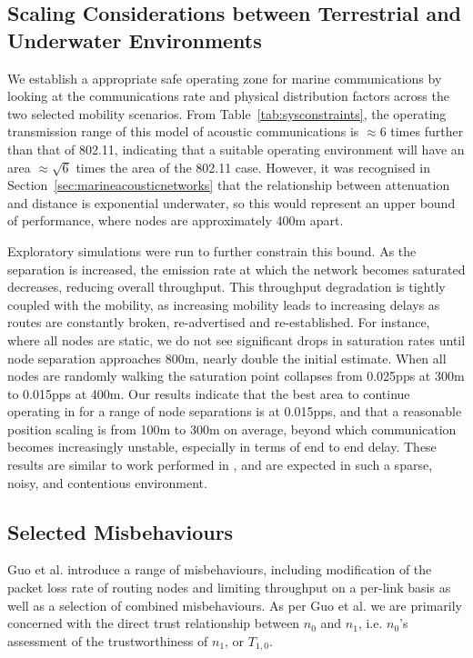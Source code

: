 \documentclass[conference]{IEEEtran}
\begin{document}
\subsection{Scaling Considerations between Terrestrial and Underwater Environments}

We establish a appropriate safe operating zone for marine communications by looking at the communications rate and physical distribution factors across the two selected mobility scenarios.
From Table~\ref{tab:sysconstraints}, the operating transmission range of this model of acoustic communications is $\approx 6$ times further than that of 802.11, indicating that a suitable operating environment will have an area $\approx \sqrt{6}$ times the area of the 802.11 case.
However, it was recognised in Section~\ref{sec:marineacousticnetworks} that the relationship between attenuation and distance is exponential underwater, so this would represent an upper bound of performance, where nodes are approximately 400m apart. 

Exploratory simulations were run to further constrain this bound.
As the separation is increased, the emission rate at which the network becomes saturated decreases, reducing overall throughput. 
This throughput degradation is tightly coupled with the mobility, as increasing mobility leads to increasing delays as routes are constantly broken, re-advertised and re-established. 
For instance, where all nodes are static, we do not see significant drops in saturation rates until node separation approaches 800m, nearly double the initial estimate. 
When all nodes are randomly walking the saturation point collapses from 0.025pps at 300m to 0.015pps at 400m.
Our results indicate that the best area to continue operating in for a range of node separations is at 0.015pps, and that a reasonable position scaling is from 100m to 300m on average, beyond which communication becomes increasingly unstable, especially in terms of end to end delay.
These results are similar to work performed in \cite{Miquel2008}, and are expected in such a sparse, noisy, and contentious environment. 


\subsection{Selected Misbehaviours}

Guo et al. introduce a range of misbehaviours, including modification of the packet loss rate of routing nodes and limiting throughput on a per-link basis as well as a selection of combined misbehaviours. 
As per Guo et al. we are primarily concerned with the direct trust relationship between $n_0$ and $n_1$, i.e. $n_0$'s assessment of the trustworthiness of $n_1$, or $T_{1,0}$.
\end{document}
